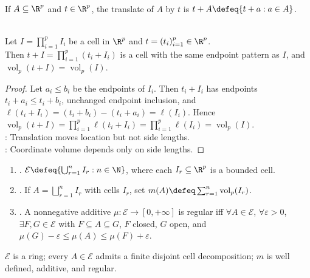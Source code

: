 \begin{definition} \label{def:translation-of-euclidean-set} \\
If $A\subseteq\R^p$ and $t\in\R^p$, the translate of $A$ by $t$ is $t+A\defeq\{t+a:a\in A\}$.
\end{definition}

\begin{proposition} \label{prop:cell-volume-translation-invariant} \\
Let $I=\prod_{i=1}^{p}I_i$ be a cell in $\R^p$ and $t=(t_i)_{i=1}^{p}\in\R^p$.\\
Then $t+I=\prod_{i=1}^{p}(t_i+I_i)$ is a cell with the same endpoint pattern as $I$, and $\operatorname{vol}_p(t+I)=\operatorname{vol}_p(I)$.
\begin{proof}
Let $a_i\leq b_i$ be the endpoints of $I_i$. Then $t_i+I_i$ has endpoints $t_i+a_i\leq t_i+b_i$, unchanged endpoint inclusion, and $\ell(t_i+I_i)=(t_i+b_i)-(t_i+a_i)=\ell(I_i)$. Hence $\operatorname{vol}_p(t+I)=\prod_{i=1}^{p}\ell(t_i+I_i)=\prod_{i=1}^{p}\ell(I_i)=\operatorname{vol}_p(I)$.\\
: Translation moves location but not side lengths.\\
: Coordinate volume depends only on side lengths.
\end{proof}
\end{proposition}

\begin{definition} \label{def:elementary-sets-and-regular-set-functions} 
\begin{enumerate}[label=(\roman*)]
\setlength{\itemsep}{0pt}
\item {}. $\mathcal{E}\defeq\{\bigcup_{r=1}^{n}I_r:n\in\N\}$, where each $I_r\subseteq\R^p$ is a bounded cell.
\item {}. If $A=\bigsqcup_{r=1}^{n}I_r$ with cells $I_r$, set $m(A)\defeq\sum_{r=1}^{n}\operatorname{vol}_p(I_r)$.
\item {}. A nonnegative additive $\mu:\mathcal{E}\to[0,+\infty]$ is regular iff $\forall A\in\mathcal{E}$, $\forall\varepsilon>0$,\\
$\exists F,G\in\mathcal{E}$ with $F\subseteq A\subseteq G$, $F$ closed, $G$ open, and $\mu(G)-\varepsilon\leq\mu(A)\leq\mu(F)+\varepsilon$.
\end{enumerate}
$\mathcal{E}$ is a ring; every $A\in\mathcal{E}$ admits a finite disjoint cell decomposition; $m$ is well defined, additive, and regular.
\end{definition}

